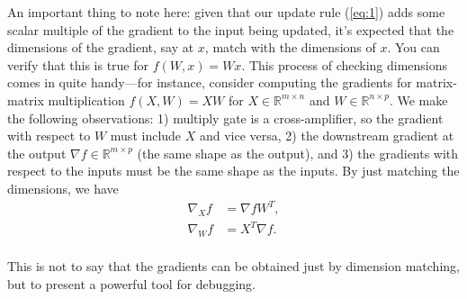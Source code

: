 An important thing to note here: given that our update rule (\ref{eq:1}) adds some scalar multiple of the gradient to the input being updated, it's expected that the dimensions of the gradient, say at $x$, match with the dimensions of $x$. You can verify that this is true for $f(W, x) = Wx$. This process of checking dimensions comes in quite handy---for instance, consider computing the gradients for matrix-matrix multiplication $f(X, W) = XW$ for $X \in \mathbb{R}^{m \times n}$ and $W \in \mathbb{R}^{n \times p}$. We make the following observations: 1) multiply gate is a cross-amplifier, so the gradient with respect to $W$ must include $X$ and vice versa, 2) the downstream gradient at the output $\nabla f \in \mathbb{R}^{m \times p}$ (the same shape as the output), and 3) the gradients with respect to the inputs must be the same shape as the inputs. By just matching the dimensions, we have 
\begin{align*}
\nabla_X f &= \nabla f W^T, \\
\nabla_W f &= X^T \nabla f. \\
\end{align*}

This is not to say that the gradients can be obtained just by dimension matching, but to present a powerful tool for debugging.
